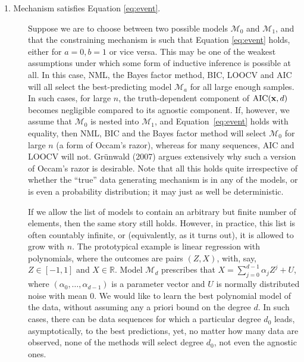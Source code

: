 \documentclass[authoryear]{elsarticle}
\newcommand{\model}{\mathcal{M}}
\begin{document}
\begin{description}
\item[1. Mechanism satisfies Equation \ref{eq:event}.] Suppose we are
  to choose between two possible models $\model_0$ and $\model_1$, and
  that the constraining mechanism is such that Equation \ref{eq:event} holds,
  either for $a=0, b= 1$ or vice versa. This may be one of the weakest
  assumptions under which some form of inductive inference is possible
  at all. In this case, NML, the Bayes factor method, BIC, LOOCV and
  AIC will all select the best-predicting model $\model_a$ for all
  large enough samples. In such cases, for large $n$, the
  truth-dependent component of $\mbox{AIC}({\bf x},d)$ becomes
  negligible compared to its agnostic component. If, however, we
  assume that $\model_0$ is nested into $\model_1$, and
  Equation~\ref{eq:event} holds with equality, then NML, BIC and the Bayes
  factor method will select $\model_0$ for large $n$ (a form of
  Occam's razor), whereas for many sequences, AIC and LOOCV will
  not. Gr\"unwald (2007) argues extensively why such a version of Occam's
  razor is desirable. Note that all this holds quite irrespective of
  whether the ``true'' data generating mechanism is in any of the
  models, or is even a probability distribution; it may just as well
  be deterministic.

  If we allow the list of models to contain an arbitrary but finite
  number of elements, then the same story still holds.  However, in
  practice, this list is often countably infinite, or (equivalently,
  as it turns out), it is allowed to grow with $n$. The prototypical
  example is linear regression with polynomials, where the outcomes
  are pairs $(Z,X)$, with, say, $Z \in [-1,1]$ and $X \in {\mathbb R}$.
  Model $\model_d$ prescribes that $X = \sum_{j=0}^{d-1} \alpha_j Z^j
  + U$, where $(\alpha_0, \ldots, \alpha_{d-1})$ is a parameter vector
  and $U$ is normally distributed noise with mean $0$. We would like
  to learn the best polynomial model of the data, without assuming any
  a
  priori  bound on the degree $d$. In such cases, there can be data
  sequences for which a particular degree $d_0$ leads, asymptotically,
  to the best predictions, yet, no matter how many data are observed,
  none of the methods will select degree $d_0$, not even the agnostic
  ones. \vspace*{12pt}


\end{description}
\end{document}
